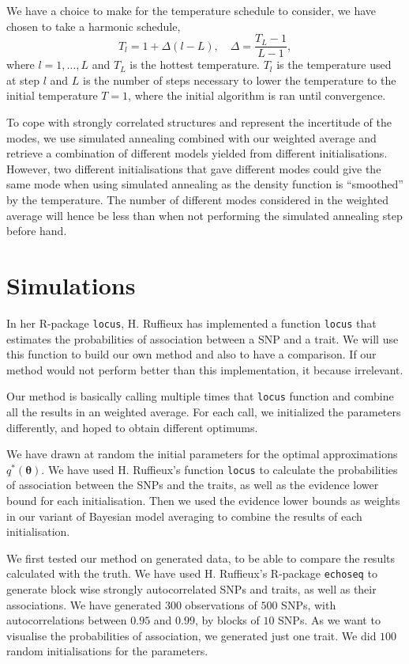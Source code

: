 \documentclass[a4paper, 11pt]{report}
\numberwithin{equation}{chapter}
\begin{document}
We have a choice to make for the temperature schedule to consider, we have chosen to take a harmonic schedule,
\begin{equation*}
T_l = 1 + \Delta(l-L),\quad \Delta = \frac{T_L - 1}{L-1},
\end{equation*}
where $l = 1,\dots,L$ and $T_L$ is the hottest temperature. $T_l$ is the temperature used at step $l$ and $L$ is the number of steps necessary to lower the temperature to the initial temperature $T = 1$, where the initial algorithm is ran until convergence.

To cope with strongly correlated structures and represent the incertitude of the modes, we use simulated annealing combined with our weighted average and retrieve a combination of different models yielded from different initialisations. However, two different initialisations that gave different modes could give the same mode when using simulated annealing as the density function is ``smoothed'' by the temperature. The number of different modes considered in the weighted average will hence be less than when not performing the simulated annealing step before hand.

\newpage
\chapter{Simulations}
In her R-package \texttt{locus}, H. Ruffieux has implemented a function \texttt{locus} that estimates the probabilities of association between a SNP and a trait. We will use this function to build our own method and also to have a comparison. If our method would not perform better than this implementation, it because irrelevant.

Our method is basically calling multiple times that \texttt{locus} function and combine all the results in an weighted average. For each call, we initialized the parameters differently, and hoped to obtain different optimums.

We have drawn at random the initial parameters for the optimal approximations $q^*(\boldsymbol{\theta})$. We have used H. Ruffieux's function \texttt{locus} to calculate the probabilities of association between the SNPs and the traits, as well as the evidence lower bound for each initialisation. Then we used the evidence lower bounds as weights in our variant of Bayesian model averaging to combine the results of each initialisation.

We first tested our method on generated data, to be able to compare the results calculated with the truth. We have used H. Ruffieux's R-package \texttt{echoseq} to generate block wise strongly autocorrelated SNPs and traits, as well as their associations. We have generated $300$ observations of $500$ SNPs, with autocorrelations between $0.95$ and $0.99$, by blocks of $10$ SNPs. As we want to visualise the probabilities of association, we generated just one trait. We did $100$ random initialisations for the parameters.
\end{document}
